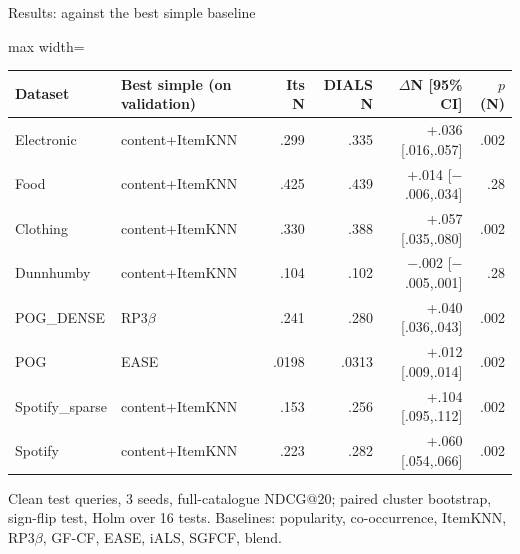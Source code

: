 \documentclass[10pt,aspectratio=169]{beamer}
\newcommand{\fn}[1]{\textcolor{Muted}{\scriptsize #1}}
\begin{document}
\begin{frame}{Results: against the best simple baseline}
\centering\renewcommand{\arraystretch}{1.3}\small
\begin{adjustbox}{max width=\textwidth}\begin{tabular}{llrrrr}\toprule
Dataset & Best simple (on validation) & Its N & DIALS N & $\Delta$N [95\% CI] & $p$ (N)\\\midrule
Electronic & content+ItemKNN & .299 & .335 & +.036 [.016,.057] & .002\\
Food & content+ItemKNN & .425 & .439 & +.014 [$-$.006,.034] & \textcolor{Warn}{.28}\\
Clothing & content+ItemKNN & .330 & .388 & +.057 [.035,.080] & .002\\
Dunnhumby & content+ItemKNN & .104 & .102 & \textcolor{Warn}{$-$.002 [$-$.005,.001]} & \textcolor{Warn}{.28}\\
POG\_DENSE & RP3$\beta$ & .241 & .280 & +.040 [.036,.043] & .002\\
POG & EASE & .0198 & .0313 & +.012 [.009,.014] & .002\\
Spotify\_sparse & content+ItemKNN & .153 & .256 & +.104 [.095,.112] & .002\\
Spotify & content+ItemKNN & .223 & .282 & +.060 [.054,.066] & .002\\\bottomrule
\end{tabular}\end{adjustbox}\par
\raggedright\vspace{2mm}
\fn{Clean test queries, 3 seeds, full-catalogue NDCG@20; paired cluster bootstrap, sign-flip test, Holm over 16 tests. Baselines: popularity, co-occurrence, ItemKNN, RP3$\beta$, GF-CF, EASE, iALS, SGFCF, blend.}
\end{frame}
\end{document}
